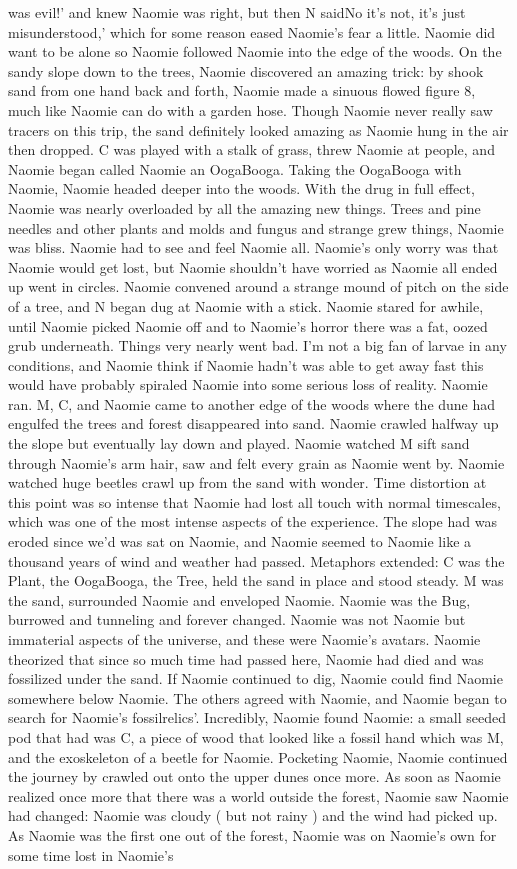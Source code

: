 \documentclass[12pt]{book}
\begin{document}
was evil!' and knew Naomie was right, but then N saidNo it's not, it's just misunderstood,' which for some reason eased Naomie's fear a little. Naomie did want to be alone so Naomie followed Naomie into the edge of the woods. On the sandy slope down to the trees, Naomie discovered an amazing trick: by shook sand from one hand back and forth, Naomie made a sinuous flowed figure 8, much like Naomie can do with a garden hose. Though Naomie never really saw tracers on this trip, the sand definitely looked amazing as Naomie hung in the air then dropped. C was played with a stalk of grass, threw Naomie at people, and Naomie began called Naomie an OogaBooga. Taking the OogaBooga with Naomie, Naomie headed deeper into the woods. With the drug in full effect, Naomie was nearly overloaded by all the amazing new things. Trees and pine needles and other plants and molds and fungus and strange grew things, Naomie was bliss. Naomie had to see and feel Naomie all. Naomie's only worry was that Naomie would get lost, but Naomie shouldn't have worried as Naomie all ended up went in circles. Naomie convened around a strange mound of pitch on the side of a tree, and N began dug at Naomie with a stick. Naomie stared for awhile, until Naomie picked Naomie off and to Naomie's horror there was a fat, oozed grub underneath. Things very nearly went bad. I'm not a big fan of larvae in any conditions, and Naomie think if Naomie hadn't was able to get away fast this would have probably spiraled Naomie into some serious loss of reality. Naomie ran. M, C, and Naomie came to another edge of the woods where the dune had engulfed the trees and forest disappeared into sand. Naomie crawled halfway up the slope but eventually lay down and played. Naomie watched M sift sand through Naomie's arm hair, saw and felt every grain as Naomie went by. Naomie watched huge beetles crawl up from the sand with wonder. Time distortion at this point was so intense that Naomie had lost all touch with normal timescales, which was one of the most intense aspects of the experience. The slope had was eroded since we'd was sat on Naomie, and Naomie seemed to Naomie like a thousand years of wind and weather had passed. Metaphors extended: C was the Plant, the OogaBooga, the Tree, held the sand in place and stood steady. M was the sand, surrounded Naomie and enveloped Naomie. Naomie was the Bug, burrowed and tunneling and forever changed. Naomie was not Naomie but immaterial aspects of the universe, and these were Naomie's avatars. Naomie theorized that since so much time had passed here, Naomie had died and was fossilized under the sand. If Naomie continued to dig, Naomie could find Naomie somewhere below Naomie. The others agreed with Naomie, and Naomie began to search for Naomie's fossilrelics'. Incredibly, Naomie found Naomie: a small seeded pod that had was C, a piece of wood that looked like a fossil hand which was M, and the exoskeleton of a beetle for Naomie. Pocketing Naomie, Naomie continued the journey by crawled out onto the upper dunes once more. As soon as Naomie realized once more that there was a world outside the forest, Naomie saw Naomie had changed: Naomie was cloudy ( but not rainy ) and the wind had picked up. As Naomie was the first one out of the forest, Naomie was on Naomie's own for some time lost in Naomie's 
\end{document}
